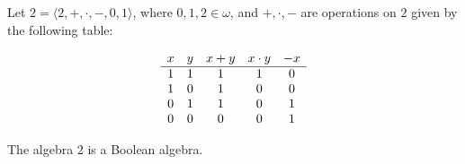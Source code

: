 Let $2 = \langle 2, +, \cdot, -, 0, 1 \rangle$, where $0, 1, 2 \in \omega$, and $+, \cdot, -$ are operations on $2$ given by the following table:

$$\begin{array}{c c c c c}
x & y & x + y & x \cdot y & -x \\
\hline
1 & 1 & 1 & 1 & 0 \\
1 & 0 & 1 & 0 & 0 \\
0 & 1 & 1 & 0 & 1 \\
0 & 0 & 0 & 0 & 1 \\
\end{array}$$

The algebra $2$ is a Boolean algebra.
